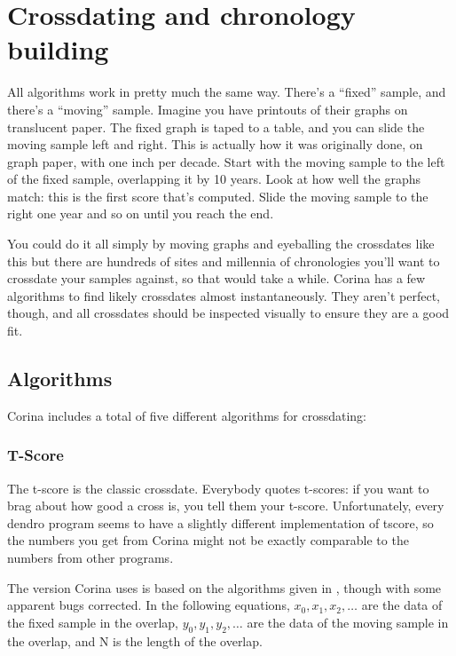 \chapter{Crossdating and chronology building}
\label{txt:crossdating}

All algorithms work in pretty much the same way. There's a ``fixed'' sample, and there's a ``moving'' sample. Imagine you have printouts of their graphs on translucent paper. The fixed graph is taped to a table, and you can slide the moving sample left and right. This is actually how it was originally done, on graph paper, with one inch per decade. Start with the moving sample to the left of the fixed sample, overlapping it by 10 years. Look at how well the graphs match: this is the first score that's computed. Slide the moving sample to the right one year and so on until you reach the end.

You could do it all simply by moving graphs and eyeballing the crossdates like this but there are hundreds of sites and millennia of chronologies you'll want to crossdate your samples against, so that would take a while. Corina has a few algorithms to find likely crossdates almost instantaneously. They aren't perfect, though, and all crossdates should be inspected visually to ensure they are a good fit. 

\section{Algorithms}
Corina includes a total of five different algorithms for crossdating:


\subsection{T-Score}
The t-score is the classic crossdate. Everybody quotes t-scores: if you want to brag about how good a cross is, you tell them your t-score. Unfortunately, every dendro program seems to have a slightly different implementation of tscore, so the numbers you get from Corina might not be exactly comparable to the numbers from other programs. 

The version Corina uses is based on the algorithms given in \citet{Baillie73}, though with some apparent bugs corrected. In the following equations, $x_{0}, x_{1}, x_{2}, \dots$ are the data of the fixed sample in the overlap, $y_{0}, y_{1}, y_{2}, \dots$ are the data of the moving sample in the overlap, and N is the length of the overlap.

